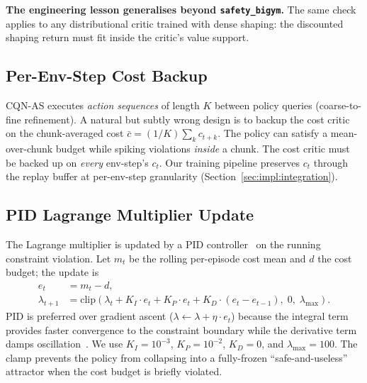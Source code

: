 \documentclass[11pt,a4paper]{report}
\newcommand{\sbigym}{\texttt{safety\_bigym}}
\newcommand{\cqnas}{CQN-AS}
\begin{document}
\textbf{The engineering lesson generalises beyond \sbigym{}.} The same
check applies to any distributional critic trained with dense shaping:
the discounted shaping return must fit inside the critic's value
support.

\subsection{Per-Env-Step Cost Backup}
\label{sec:method:lagrangian:per-step}

\cqnas{} executes \emph{action sequences} of length $K$ between
policy queries (coarse-to-fine refinement). A natural but subtly
wrong design is to backup the cost critic on the chunk-averaged
cost $\bar{c} = (1/K) \sum_{k} c_{t+k}$. The policy can satisfy a
mean-over-chunk budget while spiking violations \emph{inside} a
chunk. The cost critic must be backed up on \emph{every} env-step's
$c_t$. Our training pipeline preserves $c_t$ through the replay
buffer at per-env-step granularity
(Section~\ref{sec:impl:integration}).

\subsection{PID Lagrange Multiplier Update}
\label{sec:method:lagrangian:pid}

The Lagrange multiplier is updated by a PID
controller~\cite{stooke2020pid} on the running constraint violation.
Let $m_t$ be the rolling per-episode cost mean and $d$ the cost
budget; the update is
\begin{align}
  e_t &= m_t - d, \\
  \lambda_{t+1} &= \mathrm{clip}\!\left(\lambda_t + K_I \cdot e_t
    + K_P \cdot e_t + K_D \cdot (e_t - e_{t-1}),
    \; 0,\; \lambda_{\max}\right).
  \label{eq:pid-lambda}
\end{align}
PID is preferred over gradient ascent
($\lambda \leftarrow \lambda + \eta \cdot e_t$) because the
integral term provides faster convergence to the constraint
boundary while the derivative term damps
oscillation~\cite{stooke2020pid}. We use $K_I = 10^{-3}$,
$K_P = 10^{-2}$, $K_D = 0$, and $\lambda_{\max} = 100$. The clamp
prevents the policy from collapsing into a fully-frozen
``safe-and-useless'' attractor when the cost budget is briefly
violated.
\end{document}
